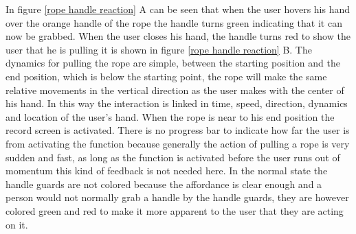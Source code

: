In figure \ref{rope handle reaction} A can be seen that when the user hovers his hand over the orange handle of the rope the handle turns green indicating that it can now be grabbed. When the user closes his hand, the handle turns red to show the user that he is pulling it is shown in figure \ref{rope handle reaction} B. The dynamics for pulling the rope are simple, between the starting position and the end position, which is below the starting point, the rope will make the same relative movements in the vertical direction as the user makes with the center of his hand. In this way the interaction is linked in time, speed, direction, dynamics and location of the user's hand. When the rope is near to his end position the record screen is activated. There is no progress bar to indicate how far the user is from activating the function because generally the action of pulling a rope is very sudden and fast, as long as the function is activated before the user runs out of momentum this kind of feedback is not needed here. In the normal state the handle guards are not colored because the affordance is clear enough and a person would not normally grab a handle by the handle guards, they are however colored green and red to make it more apparent to the user that they are acting on it.\\

